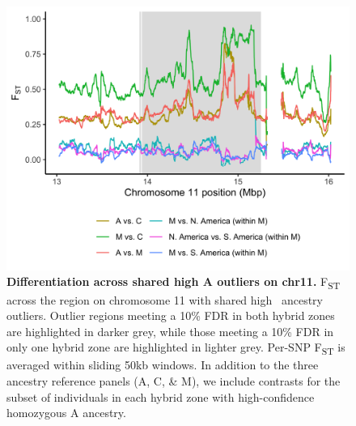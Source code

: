 \begin{figure}[ht]
\includegraphics[width = \textwidth]{chapter1/figures/Fst_across_chr11_highA_outlier.png}
 \caption{ \textbf{Differentiation across shared high A outliers on chr11.} F\textsubscript{ST} across the region on chromosome 11 with shared high \A\ ancestry outliers. Outlier regions meeting a 10\% FDR in both hybrid zones are highlighted in darker grey, while those meeting a 10\% FDR in only one hybrid zone are highlighted in lighter grey. Per-SNP F\textsubscript{ST} is averaged within sliding 50kb windows. In addition to the three ancestry reference panels (A, C, \& M), we include contrasts for the subset of individuals in each hybrid zone with high-confidence homozygous A ancestry.}
\label{fst_chr11_A_outlier}
\end{figure}

